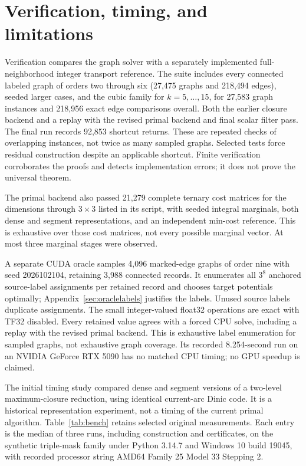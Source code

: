 \documentclass[11pt]{article}
\theoremstyle{remark}
\begin{document}
\section{Verification, timing, and limitations}\label{sec:experiments}

Verification compares the graph solver with a separately implemented full-neighborhood integer transport reference. The suite includes every connected labeled graph of orders two through six (27,475 graphs and 218,494 edges), seeded larger cases, and the cubic family for $k=5,\ldots,15$, for 27,583 graph instances and 218,956 exact edge comparisons overall. Both the earlier closure backend and a replay with the revised primal backend and final scalar filter pass. The final run records 92,853 shortcut returns. These are repeated checks of overlapping instances, not twice as many sampled graphs. Selected tests force residual construction despite an applicable shortcut. Finite verification corroborates the proofs and detects implementation errors; it does not prove the universal theorem.

The primal backend also passed 21,279 complete ternary cost matrices for the dimensions through $3\times3$ listed in its script, with seeded integral marginals, both dense and segment representations, and an independent min-cost reference. This is exhaustive over those cost matrices, not every possible marginal vector. At most three marginal stages were observed.

A separate CUDA oracle samples 4,096 marked-edge graphs of order nine with seed 2026102104, retaining 3,988 connected records. It enumerates all $3^8$ anchored source-label assignments per retained record and chooses target potentials optimally; Appendix~\ref{sec:oraclelabels} justifies the labels. Unused source labels duplicate assignments. The small integer-valued float32 operations are exact with TF32 disabled. Every retained value agrees with a forced CPU solve, including a replay with the revised primal backend. This is exhaustive label enumeration for sampled graphs, not exhaustive graph coverage. Its recorded 8.254-second run on an NVIDIA GeForce RTX 5090 has no matched CPU timing; no GPU speedup is claimed.

The initial timing study compared dense and segment versions of a two-level maximum-closure reduction, using identical current-arc Dinic code. It is a historical representation experiment, not a timing of the current primal algorithm. Table~\ref{tab:bench} retains selected original measurements. Each entry is the median of three runs, including construction and certificates, on the synthetic triple-mask family under Python 3.14.7 and Windows 10 build 19045, with recorded processor string AMD64 Family 25 Model 33 Stepping 2.
\end{document}
